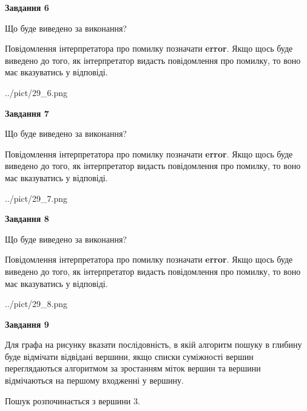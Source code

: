 \documentclass[12pt, ukrainian]{article}
\begin{document}
{\begin {large}
{\begin {center}\textbf{Завдання 6}\end {center}}\par
Що буде виведено за виконання?

Повідомлення інтерпретатора про помилку позначати \textbf{error}.
Якщо щось буде виведено до того, як інтерпретатор видасть повідомлення про помилку, 
то воно має вказуватись у відповіді. \par


\begin{center}
	{../pict/29_6.png}
\end{center}
\newpage

{\begin {center}\textbf{Завдання 7}\end {center}}\par
Що буде виведено за виконання?

Повідомлення інтерпретатора про помилку позначати \textbf{error}.
Якщо щось буде виведено до того, як інтерпретатор видасть повідомлення про помилку, 
то воно має вказуватись у відповіді. \par


\begin{center}
	{../pict/29_7.png}
\end{center}
\newpage

{\begin {center}\textbf{Завдання 8}\end {center}}\par
Що буде виведено за виконання?

Повідомлення інтерпретатора про помилку позначати \textbf{error}.
Якщо щось буде виведено до того, як інтерпретатор видасть повідомлення про помилку, 
то воно має вказуватись у відповіді. \par


\begin{center}
	{../pict/29_8.png}
\end{center}
\newpage

{\begin {center}\textbf{Завдання 9}\end {center}}\par
Для графа на рисунку вказати послідовність, в якій алгоритм пошуку в глибину буде відмічати відвідані вершини, якщо списки суміжності вершин переглядаються алгоритмом за зростанням міток вершин та вершини відмічаються на першому вход\-женні у вершину.\par
Пошук розпочинається з вершини 3.\par


\end{large}}
\end{document}

